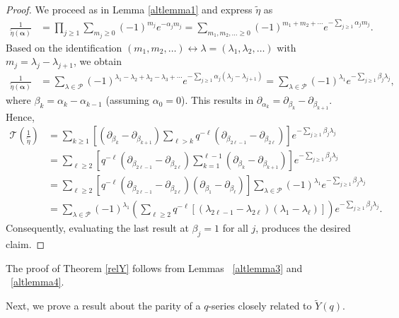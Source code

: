 \documentclass[a4paper,reqno,12pt]{amsart}
\begin{document}
\begin{proof} We proceed as in Lemma \ref{altlemma1} and express $\widetilde{\eta}$ as 
\begin{align*}  \frac1{\widetilde{\eta}(\pmb{\alpha})} & = \prod_{j\geq1} \sum_{m_j\geq0} (-1)^{m_j} e^{-\alpha_j m_j} = 
\sum_{m_1, m_2, \dots\geq0} (-1)^{m_1+m_2+\cdots} e^{-\sum_{j\geq1} \alpha_j m_j}.
\end{align*}
Based on the identification  $(m_1, m_2, \dots) \longleftrightarrow \lambda=(\lambda_1, \lambda_2, \dots)$ with $m_j=\lambda_j-\lambda_{j+1}$, we obtain
\begin{align*} \frac1{\widetilde{\eta}(\pmb{\alpha})} & = \sum_{\lambda\in\mathcal{P}} (-1)^{\lambda_1-\lambda_2+\lambda_2-\lambda_3+\cdots} e^{-\sum_{j\geq1} \alpha_j(\lambda_j-\lambda_{j+1})}
=  \sum_{\lambda\in\mathcal{P}} (-1)^{\lambda_1} e^{-\sum_{j\geq1} \beta_j \lambda_j},
\end{align*}
where $\beta_k=\alpha_k-\alpha_{k-1}$ (assuming $\alpha_0=0$). This results in $\partial_{\alpha_k} = \partial_{\beta_k}-\partial_{\beta_{k+1}}$.  Hence,
\begin{align*}  \mathcal{T} \left(\frac1{\widetilde{\eta}}\right)
 &= \sum_{k\geq1} \left[ (\partial_{\beta_k}-\partial_{\beta_{k+1}}) 
 \sum_{\ell>k}q^{-\ell} (\partial_{\beta_{2\ell-1}}-\partial_{\beta_{2\ell}}) \right] e^{-\sum_{j\geq1} \beta_j \lambda_j}  \\
 &= \sum_{\ell\geq2} \left[ q^{-\ell} (\partial_{\beta_{2\ell-1}}-\partial_{\beta_{2\ell}})  \sum_{k=1}^{\ell-1} (\partial_{\beta_k}-\partial_{\beta_{k+1}}) \right] e^{-\sum_{j\geq1} \beta_j \lambda_j}  \\
 &= \sum_{\ell\geq2} \left[ q^{-\ell} (\partial_{\beta_{2\ell-1}}-\partial_{\beta_{2\ell}})   (\partial_{\beta_1}-\partial_{\beta_{\ell}}) \right] 
\sum_{\lambda\in\mathcal{P}} (-1)^{\lambda_1} e^{-\sum_{j\geq1} \beta_j \lambda_j}  \\
&= \sum_{\lambda\in\mathcal{P}}  (-1)^{\lambda_1} \left( \sum_{\ell\geq2} q^{-\ell}
[(\lambda_{2\ell-1}-\lambda_{2\ell})(\lambda_1-\lambda_{\ell})] \right)  e^{-\sum_{j\geq1} \beta_j \lambda_j}.
\end{align*}
Consequently, evaluating the last result at $\beta_j=1$ for all $j$, produces the desired claim. 
\end{proof}
The proof of Theorem \ref{relY} follows from Lemmas ~\ref{altlemma3} and ~\ref{altlemma4}.






Next, we prove a result about the parity of a $q$-series  closely related to  $\widetilde Y(q)$.
\end{document}
